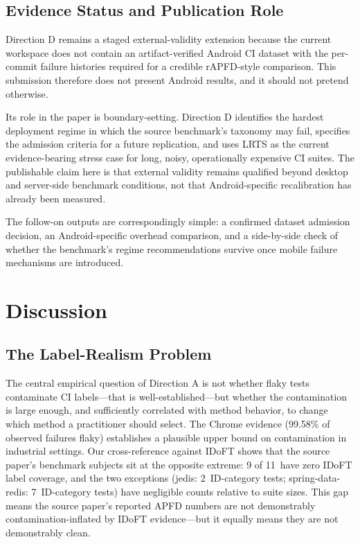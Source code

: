 \documentclass[10pt,conference]{IEEEtran}
\begin{document}
\subsection{Evidence Status and Publication Role}

Direction D remains a staged external-validity extension because the current workspace does not contain an artifact-verified Android CI dataset with the per-commit failure histories required for a credible rAPFD-style comparison. This submission therefore does not present Android results, and it should not pretend otherwise.

Its role in the paper is boundary-setting. Direction D identifies the hardest deployment regime in which the source benchmark's taxonomy may fail, specifies the admission criteria for a future replication, and uses LRTS as the current evidence-bearing stress case for long, noisy, operationally expensive CI suites. The publishable claim here is that external validity remains qualified beyond desktop and server-side benchmark conditions, not that Android-specific recalibration has already been measured.

The follow-on outputs are correspondingly simple: a confirmed dataset admission decision, an Android-specific overhead comparison, and a side-by-side check of whether the benchmark's regime recommendations survive once mobile failure mechanisms are introduced.

\section{Discussion}\label{sec:discussion}

\subsection{The Label-Realism Problem}

The central empirical question of Direction A is not whether flaky tests contaminate CI labels---that is well-established---but whether the contamination is large enough, and sufficiently correlated with method behavior, to change which method a practitioner should select. The Chrome evidence (99.58\% of observed failures flaky) establishes a plausible upper bound on contamination in industrial settings. Our cross-reference against IDoFT shows that the source paper's benchmark subjects sit at the opposite extreme: 9 of 11~have zero IDoFT label coverage, and the two exceptions (jedis: 2~ID-category tests; spring-data-redis: 7~ID-category tests) have negligible counts relative to suite sizes. This gap means the source paper's reported APFD numbers are not demonstrably contamination-inflated by IDoFT evidence---but it equally means they are not demonstrably clean.
\end{document}
